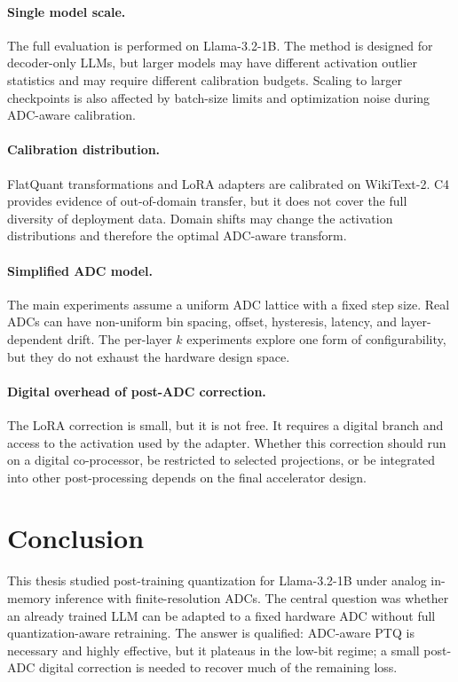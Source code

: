 \documentclass[a4paper,11pt,oneside]{article}
\theoremstyle{breakstyle}
\begin{document}
  \paragraph{Single model scale.}
  The full evaluation is performed on Llama-3.2-1B.  The method is
  designed for decoder-only LLMs, but larger models may have different
  activation outlier statistics and may require different calibration
  budgets.  Scaling to larger checkpoints is also affected by batch-size
  limits and optimization noise during ADC-aware calibration.

  \paragraph{Calibration distribution.}
  FlatQuant transformations and LoRA adapters are calibrated on
  WikiText-2.  C4 provides evidence of out-of-domain transfer, but it
  does not cover the full diversity of deployment data.  Domain shifts
  may change the activation distributions and therefore the optimal
  ADC-aware transform.

  \paragraph{Simplified ADC model.}
  The main experiments assume a uniform ADC lattice with a fixed step
  size.  Real ADCs can have non-uniform bin spacing, offset, hysteresis,
  latency, and layer-dependent drift.  The per-layer \(k\) experiments
  explore one form of configurability, but they do not exhaust the
  hardware design space.

  \paragraph{Digital overhead of post-ADC correction.}
  The LoRA correction is small, but it is not free.  It requires a
  digital branch and access to the activation used by the adapter.
  Whether this correction should run on a digital co-processor, be
  restricted to selected projections, or be integrated into other
  post-processing depends on the final accelerator design.

  \section{Conclusion}
  \label{sec:conclusion}

  This thesis studied post-training quantization for Llama-3.2-1B under
  analog in-memory inference with finite-resolution ADCs.  The central
  question was whether an already trained LLM can be adapted to a fixed
  hardware ADC without full quantization-aware retraining.  The answer is
  qualified: ADC-aware PTQ is necessary and highly effective, but it
  plateaus in the low-bit regime; a small post-ADC digital correction is
  needed to recover much of the remaining loss.
\end{document}
